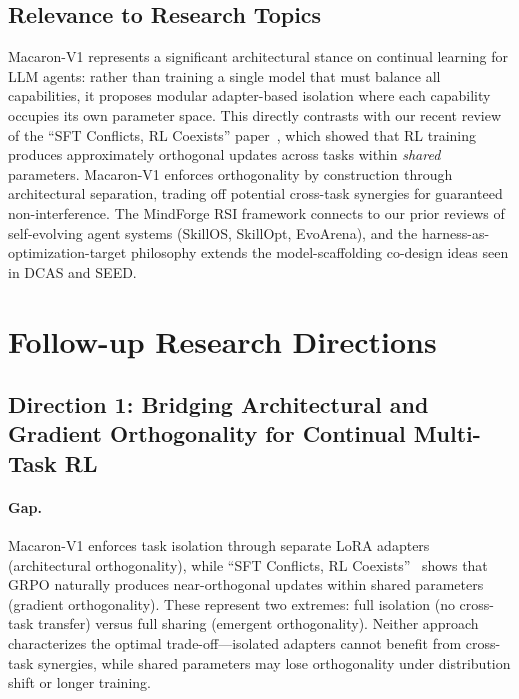 \documentclass[11pt,a4paper]{article}
\begin{document}
\subsection{Relevance to Research Topics}

Macaron-V1 represents a significant architectural stance on continual learning for LLM agents: rather than training a single model that must balance all capabilities, it proposes modular adapter-based isolation where each capability occupies its own parameter space. This directly contrasts with our recent review of the ``SFT Conflicts, RL Coexists'' paper~\cite{zhu2026sft}, which showed that RL training produces approximately orthogonal updates across tasks within \emph{shared} parameters. Macaron-V1 enforces orthogonality by construction through architectural separation, trading off potential cross-task synergies for guaranteed non-interference. The MindForge RSI framework connects to our prior reviews of self-evolving agent systems (SkillOS, SkillOpt, EvoArena), and the harness-as-optimization-target philosophy extends the model-scaffolding co-design ideas seen in DCAS and SEED.

\section{Follow-up Research Directions}

\subsection{Direction 1: Bridging Architectural and Gradient Orthogonality for Continual Multi-Task RL}

\paragraph{Gap.} Macaron-V1 enforces task isolation through separate LoRA adapters (architectural orthogonality), while ``SFT Conflicts, RL Coexists''~\cite{zhu2026sft} shows that GRPO naturally produces near-orthogonal updates within shared parameters (gradient orthogonality). These represent two extremes: full isolation (no cross-task transfer) versus full sharing (emergent orthogonality). Neither approach characterizes the optimal trade-off---isolated adapters cannot benefit from cross-task synergies, while shared parameters may lose orthogonality under distribution shift or longer training.
\end{document}
